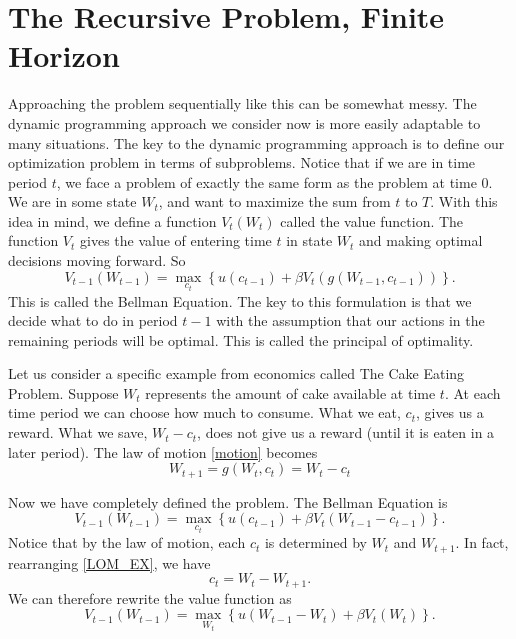 \section*{The Recursive Problem, Finite Horizon}
Approaching the problem sequentially like this can be somewhat messy.  The dynamic programming approach we consider now is more 
easily adaptable to many situations.  The key to the dynamic programming approach is to define our optimization problem in terms
 of subproblems.  Notice that if we are in time period $t$, we face a problem of exactly the same form as the problem at time 
 $0$.  We are in some state $W_t$, and want to maximize the sum from $t$ to $T$.  With this idea in mind, we define a function
  $V_t(W_t)$ called the value function.  The function $V_t$ gives the value of entering time $t$ in state $W_t$ and making 
  optimal decisions moving forward.  So
\begin{equation*}
V_{t-1}(W_{t-1}) = \max_{c_t} \left\{u(c_{t-1}) + \beta V_t(g(W_{t-1},c_{t-1}))\right\}.
\end{equation*}
This is called the Bellman Equation.  The key to this formulation is that we decide what to do in period $t-1$ with the 
assumption that our actions in the remaining periods will be optimal.  This is called the principal of optimality.

Let us consider a specific example from economics called The Cake Eating Problem.  Suppose $W_t$ represents the amount of  
cake available at time $t$.  At each time period we can choose how much to consume.  What we eat, $c_t$, gives us a reward.  
What we save, $W_t-c_t$, does not give us a reward (until it is eaten in a later period).  The law of motion \eqref{motion} 
becomes
\begin{equation}\label{LOM_EX}
W_{t+1} = g(W_t,c_t) = W_t-c_t
\end{equation}

Now we have completely defined the problem.  The Bellman Equation is
\begin{equation*}
V_{t-1}(W_{t-1}) = \max_{c_t} \left\{u(c_{t-1}) + \beta V_t(W_{t-1}-c_{t-1})\right\}.
\end{equation*}
Notice that by the law of motion, each $c_t$ is determined by $W_t$ and $W_{t+1}$. 
In fact, rearranging \eqref{LOM_EX}, we have
\begin{equation*}
c_t = W_t - W_{t+1}.
\end{equation*}
We can therefore rewrite the value function as
\begin{equation}
V_{t-1}(W_{t-1}) = \max_{W_t} \left\{u(W_{t-1} - W_{t}) + \beta V_t(W_t)\right\}.
\label{cake_valfn}
\end{equation}

